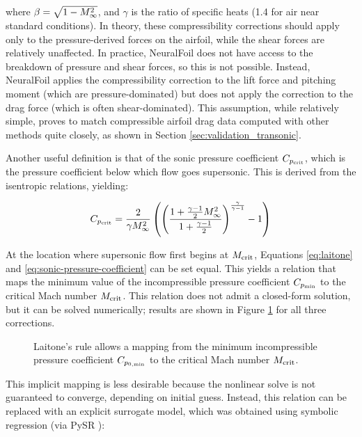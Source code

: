 \documentclass[conf]{new-aiaa}
\begin{document}
    \noindent where $\beta = \sqrt{1- M_\infty^2}$, and $\gamma$ is the ratio of specific heats (1.4 for air near standard conditions). In theory, these compressibility corrections should apply only to the pressure-derived forces on the airfoil, while the shear forces are relatively unaffected. In practice, NeuralFoil does not have access to the breakdown of pressure and shear forces, so this is not possible. Instead, NeuralFoil applies the compressibility correction to the lift force and pitching moment (which are pressure-dominated) but does not apply the correction to the drag force (which is often shear-dominated). This assumption, while relatively simple, proves to match compressible airfoil drag data computed with other methods quite closely, as shown in Section \ref{sec:validation_transonic}.

    Another useful definition is that of the sonic pressure coefficient $C_{p_{\rm crit}}$, which is the pressure coefficient below which flow goes supersonic. This is derived from the isentropic relations, yielding:

    \begin{equation}
        C_{p_{\rm crit}} = \frac{2}{\gamma M_\infty^{2}} \left(
        \left(
        \frac{1 + \frac{\gamma - 1}{2} M_\infty^{2}}{1 + \frac{\gamma - 1}{2}}
        \right)^{\frac{\gamma}{\gamma - 1}}
        - 1
        \right)
        \label{eq:sonic-pressure-coefficient}
    \end{equation}

    At the location where supersonic flow first begins at $M_{\rm crit}$, Equations \ref{eq:laitone} and \ref{eq:sonic-pressure-coefficient} can be set equal. This yields a relation that maps the minimum value of the incompressible pressure coefficient $C_{p_{\rm min}}$ to the critical Mach number $M_{\rm crit}$. This relation does not admit a closed-form solution, but it can be solved numerically; results are shown in Figure \ref{fig:compressibility_corrections} for all three corrections.

    \begin{figure}[h]
        \centering
        
        \caption{Laitone's rule allows a mapping from the minimum incompressible pressure coefficient $C_{p_{0,\rm min}}$ to the critical Mach number $M_{\rm crit}$.}
        \label{fig:compressibility_corrections}
    \end{figure}

    This implicit mapping is less desirable because the nonlinear solve is not guaranteed to converge, depending on initial guess. Instead, this relation can be replaced with an explicit surrogate model, which was obtained using symbolic regression (via PySR \cite{cranmer_interpretable_2023}):
\end{document}
